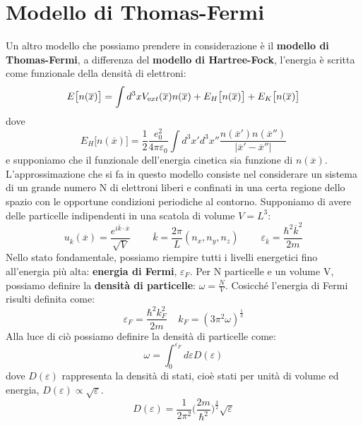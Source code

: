 \section{Modello di Thomas-Fermi}
Un altro modello che possiamo prendere in considerazione è il \textbf{modello di Thomas-Fermi}, a differenza del \textbf{modello di Hartree-Fock}, l'energia è scritta come funzionale della densità di elettroni:
\begin{equation*}
    E\big[n(\overline x)\big]=\int d^3xV_{\text ext}(\overline x)n(\overline x)+E_H\big[n(\overline x)\big]+E_K\big[n(\overline x)\big]
\end{equation*}
dove
\begin{equation*}
    E_H\big[n(\overline x)\big]=\frac 12 \frac{e_0^2}{4\pi\varepsilon_0}\int d^3x'd^3x''\frac{n(\overline{x}')n(\overline{x}'')}{|\overline{x}'-\overline{x}''|}
\end{equation*}
e supponiamo che il funzionale dell'energia cinetica sia funzione di $n(\overline x)$.
L'approssimazione che si fa in questo modello consiste nel considerare un sistema di un grande numero N di elettroni liberi e confinati in una certa regione dello spazio con le opportune condizioni periodiche al contorno. Supponiamo di avere delle particelle indipendenti in una scatola di volume $V=L^3$:
\begin{equation*}
    u_{\overline k}(\overline x)=\frac{e^{i\overline k \cdot \overline x}}{\sqrt V} \ \ \ \ \ \ \ \ \ \  \overline k = \frac{2\pi}{L}(n_x,n_y,n_z) \ \ \ \ \ \ \ \ \ \ \varepsilon_{\overline k}=\frac{\hbar^2\overline{k}^2}{2m}
\end{equation*}
Nello stato fondamentale, possiamo riempire tutti i livelli energetici fino all'energia più alta: \textbf{energia di Fermi}, $\varepsilon_F$.
Per N particelle e un volume V, possiamo definire la \textbf{densità di particelle}: $\omega=\frac NV$. Cosicché l'energia di Fermi risulti definita come:
\begin{equation*}
    \varepsilon_F=\frac{\hbar^2k_F^2}{2m} \ \ \ \ \ k_F=(3\pi^2\omega)^{\frac 13}
\end{equation*}
Alla luce di ciò possiamo definire la densità di particelle come:
\begin{equation*}
    \omega=\int_0^{\varepsilon_F}d\varepsilon D(\varepsilon)
\end{equation*}
dove $D(\varepsilon)$ rappresenta la densità di stati, cioè stati per unità di volume ed energia, $D(\varepsilon)\propto\sqrt\varepsilon$.
\begin{equation*}
    D(\varepsilon)=\frac{1}{2\pi^2}\bigg(\frac{2m}{\hbar^2}\bigg)^{\frac 32}\sqrt\varepsilon
\end{equation*}
